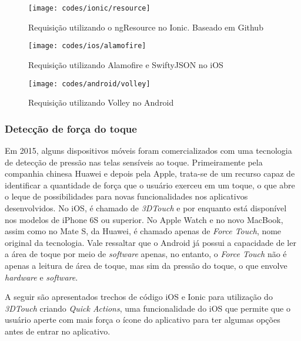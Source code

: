 \begin{figure}[H]
	\centering
	\texttt{[image: codes/ionic/resource]}
	\caption[Requisição utilizando o ngResource no Ionic]{Requisição utilizando o ngResource no Ionic. Baseado em Github\protect\footnotemark}
	\label{fig:resource-ionic}
\end{figure}
\begin{figure}[H]
	\centering
	\texttt{[image: codes/ios/alamofire]}
	\caption[Requisição utilizando Alamofire e SwiftyJSON no iOS]{Requisição utilizando Alamofire e SwiftyJSON no iOS}
	\label{fig:alamofire-ios}
\end{figure} 
\begin{figure}[H]
	\centering
	\texttt{[image: codes/android/volley]}
	\caption[Requisição utilizando Volley no Android]{Requisição utilizando Volley no Android}
	\label{fig:volley-android}
\end{figure}


\subsubsection{Detecção de força do toque} \label{subsubsec:forcetouch}
Em 2015, alguns dispositivos móveis foram comercializados com uma tecnologia de detecção de pressão nas telas sensíveis ao toque. Primeiramente pela companhia chinesa Huawei e depois pela Apple, trata-se de um recurso 
capaz de identificar a quantidade de força que o usuário exerceu em um toque, o que abre o leque de possibilidades para novas funcionalidades nos aplicativos desenvolvidos. 
No iOS, é chamado de \textit{3DTouch} e por enquanto está disponível nos modelos de iPhone 6S ou superior. No Apple Watch e no novo MacBook, assim como no Mate S, da Huawei, é chamado apenas de \textit{Force Touch}, 
nome original da tecnologia. 
Vale ressaltar que o Android já possui a capacidade de ler a área de toque por meio de \textit{software} apenas, no entanto, o \textit{Force Touch} não é apenas a leitura de área de toque, mas sim da pressão do toque,
o que envolve \textit{hardware} e \textit{software}.

A seguir são apresentados trechos de código iOS e Ionic para utilização do \textit{3DTouch} criando \textit{Quick Actions}, uma funcionalidade do iOS que permite que o usuário aperte com mais força o ícone do aplicativo 
para ter algumas opções antes de entrar no aplicativo.

